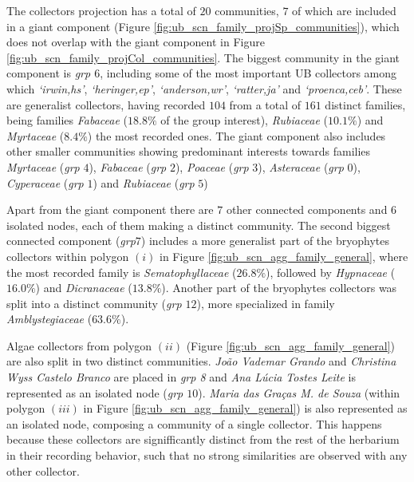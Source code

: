 The collectors projection has a total of $20$ communities, $7$ of which are included in a giant component (Figure \ref{fig:ub_scn_family_projSp_communities}), which does not overlap with the giant component in Figure \ref{fig:ub_scn_family_projCol_communities}.
The biggest community in the giant component is \textit{grp $6$}, including some of the most important UB collectors among which \textit{`irwin,hs'}, \textit{`heringer,ep'}, \textit{`anderson,wr'}, \textit{`ratter,ja'} and \textit{`proenca,ceb'}.
These are generalist collectors, having recorded $104$ from a total of $161$ distinct families, being families \textit{Fabaceae} ($18.8\%$ of the group interest), \textit{Rubiaceae} ($10.1\%$) and \textit{Myrtaceae} ($8.4\%$) the most recorded ones. 
%
The giant component also includes other smaller communities showing predominant interests towards families \textit{Myrtaceae} (\textit{grp} $4$), \textit{Fabaceae} (\textit{grp} $2$), \textit{Poaceae} (\textit{grp} $3$), \textit{Asteraceae} (\textit{grp} $0$), \textit{Cyperaceae} (\textit{grp} $1$) and \textit{Rubiaceae} (\textit{grp} $5$)

Apart from the giant component there are $7$ other connected components and $6$ isolated nodes, each of them making a distinct community.
The second biggest connected component (\textit{grp{$7$}}) includes a more generalist part of the bryophytes collectors within polygon $(i)$ in Figure \ref{fig:ub_scn_agg_family_general}, where the most recorded family is \textit{Sematophyllaceae} ($26.8\%$), followed by \textit{Hypnaceae} ($16.0\%$) and \textit{Dicranaceae} ($13.8\%$). 
Another part of the bryophytes collectors was split into a distinct community (\textit{grp $12$}), more specialized in family \textit{Amblystegiaceae} ($63.6\%$).

Algae collectors from polygon $(ii)$ (Figure \ref{fig:ub_scn_agg_family_general}) are also split in two distinct communities.
\textit{João Vademar Grando} and \textit{Christina Wyss Castelo Branco} are placed in \textit{grp 8} and \textit{Ana Lúcia Tostes Leite} is represented as an isolated node (\textit{grp $10$}).
\textit{Maria das Graças M. de Souza} (within polygon $(iii)$ in Figure \ref{fig:ub_scn_agg_family_general}) is also represented as an isolated node, composing a community of a single collector.
This happens because these collectors are signifficantly distinct from the rest of the herbarium in their recording behavior, such that no strong similarities are observed with any other collector.

